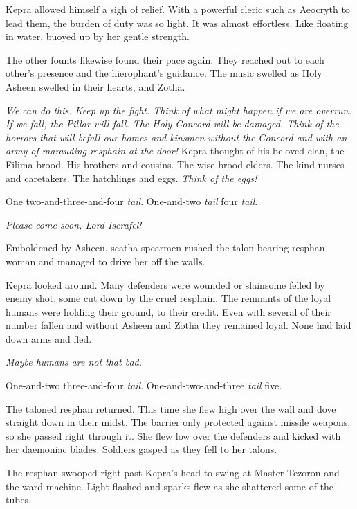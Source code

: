 \documentclass
  [a4paper,
   12pt,
   oneside
  ]%
  {article}
\newcommand{\drum}[1]{\textsf{#1}}
\begin{document}
Kepra allowed himself a sigh of relief.
With a powerful cleric such as Aeocryth to lead them, the burden of duty was so light. 
It was almost effortless. 
Like floating in water, buoyed up by her gentle strength.

The other founts likewise found their pace again. 
They reached out to each other’s presence and the hierophant’s guidance. 
The music swelled as Holy Asheen swelled in their hearts, and Zotha.

\emph{
    We can do this.
    Keep up the fight. Think of what might happen if we are overrun. If we fall, the Pillar will fall. The Holy Concord will be damaged. 
    Think of the horrors that will befall our homes and kinsmen without the Concord and with an army of marauding resphain at the door!%
} 
Kepra thought of his beloved clan, the Filima brood. His brothers and cousins. The wise brood elders. The kind nurses and caretakers. The hatchlings and eggs. 
\emph{Think of the eggs!}

\drum{One two-and-three-and-four \emph{tail}. One-and-two \emph{tail} four \emph{tail}.}

\emph{Please come soon, Lord Iscrafel!}

Emboldened by Asheen, scatha spearmen rushed the talon-bearing resphan woman and managed to drive her off the walls. 

Kepra looked around. Many defenders were wounded or slain\dash{}some felled by enemy shot, some cut down by the cruel resphain. 
The remnants of the loyal humans were holding their ground, to their credit. 
Even with several of their number fallen and without Asheen and Zotha they remained loyal. None had laid down arms and fled. 

\emph{Maybe humans are not that bad.}

\drum{One-and-two three-and-four \emph{tail}. One-and-two-and-three \emph{tail} five.}

The taloned resphan returned. This time she flew high over the wall and dove straight down in their midst. 
The barrier only protected against missile weapons, so she passed right through it. 
She flew low over the defenders and kicked with her daemoniac blades. 
Soldiers gasped as they fell to her talons.

The resphan swooped right past Kepra’s head to swing at Master Tezoron and the ward machine. 
Light flashed and sparks flew as she shattered some of the tubes. 
\end{document}
